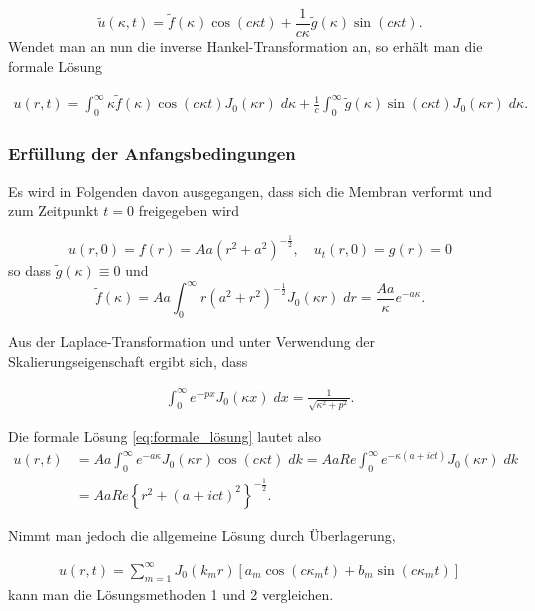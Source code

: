 \begin{equation*}
	\tilde{u}(\kappa,t)=\tilde{f}(\kappa)\cos(c\kappa t) + \frac{1}{c\kappa}\tilde{g}(\kappa)\sin(c\kappa t).
\end{equation*}
Wendet man an nun die inverse Hankel-Transformation an, so erhält man die formale Lösung

\begin{align}
	u(r,t)=\int_{0}^{\infty}\kappa\tilde{f}(\kappa)\cos(c\kappa t) J_0(\kappa r) \; d\kappa +\frac{1}{c}\int_{0}^{\infty}\tilde{g}(\kappa)\sin(c\kappa t)J_0(\kappa r) \; d\kappa.
	\label{eq:formale_lösung}
\end{align}

\subsubsection{Erfüllung der Anfangsbedingungen\label{subsub:erfüllung_AB}}
Es wird in Folgenden davon ausgegangen, dass sich die Membran verformt und zum Zeitpunkt $t=0$ freigegeben wird

\begin{equation*}
	u(r,0)=f(r)=Aa(r^2 + a^2)^{-\frac{1}{2}}, \quad u_t(r,0)=g(r)=0
\end{equation*}
so dass $\tilde{g}(\kappa)\equiv 0$ und
\begin{equation*}
	\tilde{f}(\kappa)=Aa\int_{0}^{\infty}r(a^2 + r^2)^{-\frac{1}{2}} J_0 (\kappa r) \; dr=\frac{Aa}{\kappa}e^{-a\kappa}.
\end{equation*}

Aus der Laplace-Transformation und unter Verwendung der Skalierungseigenschaft ergibt sich, dass

\begin{align*}
	\int_{0}^{\infty}e^{-px} J_0(\kappa x) \; dx = \frac{1}{\sqrt{\kappa^2 + p^2}}.
\end{align*}	

Die formale Lösung  \eqref{eq:formale_lösung} lautet also
\begin{align*}
	u(r,t)&=Aa\int_{0}^{\infty}e^{-a\kappa} J_0(\kappa r)\cos(c\kappa t) \; dk=AaRe\int_{0}^{\infty}e^{-\kappa(a+ict)} J_0(\kappa r) \; dk\\
	&=AaRe\left\{r^2+\left(a+ict\right)^2\right\}^{-\frac{1}{2}}.
\end{align*}

Nimmt man jedoch die allgemeine Lösung durch Überlagerung, 

\begin{align}
	u(r, t) = \displaystyle\sum_{m=1}^{\infty} J_0 (k_{m}r)[a_{m}\cos(c \kappa_{m} t)+b_{m}\sin(c \kappa_{m} t)]
	\label{eq:lösung_unendliche_generelle}
\end{align}
kann man die Lösungsmethoden 1 und 2 vergleichen.

